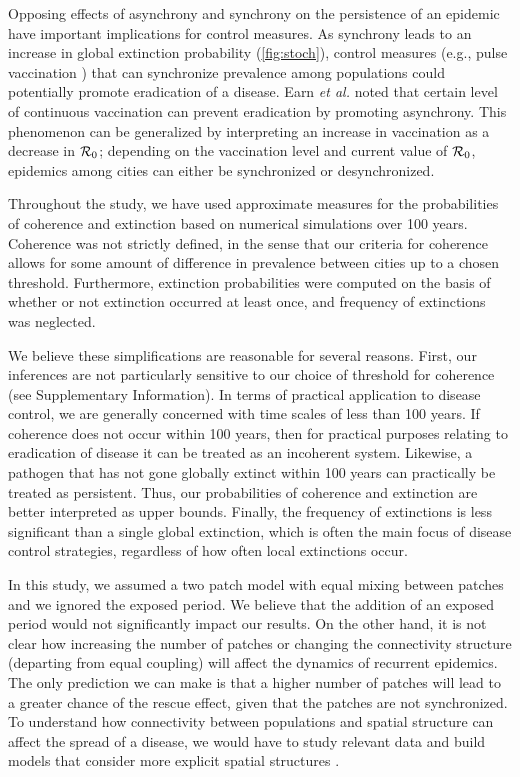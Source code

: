 \documentclass[12pt]{article}
\newcommand{\R}{{\cal R}}
\begin{document}
Opposing effects of asynchrony and synchrony on the persistence of an epidemic have important implications for control measures.
As synchrony leads to an increase in global extinction probability (\autoref{fig:stoch}), control measures (e.g., pulse vaccination \cite{agur1993pulse, shulgin1998pulse}) that can synchronize prevalence among populations could potentially promote eradication of a disease.
Earn \textit{et al.} \cite{earn1998persistence} noted that certain level of continuous vaccination can prevent eradication by promoting asynchrony.
This phenomenon can be generalized by interpreting an increase in vaccination as a decrease in $\R_0$; depending on the vaccination level and current value of $\R_0$, epidemics among cities can either be synchronized or desynchronized.

Throughout the study, we have used approximate measures for the probabilities of coherence and extinction based on numerical simulations over 100 years.
Coherence was not strictly defined, in the sense that our criteria for coherence allows for some amount of difference in prevalence between cities up to a chosen threshold.
Furthermore, extinction probabilities were computed on the basis of whether or not extinction occurred at least once, and frequency of extinctions was neglected.

We believe these simplifications are reasonable for several reasons. 
First, our inferences are not particularly sensitive to our choice of threshold for coherence (see Supplementary Information).
In terms of practical application to disease control, we are generally concerned with time scales of less than 100 years. 
If coherence does not occur within 100 years, then for practical purposes relating to eradication of disease it can be treated as an incoherent system.
Likewise, a pathogen that has not gone globally extinct within 100 years can practically be treated as persistent.
Thus, our probabilities of coherence and extinction are better interpreted as upper bounds.
Finally, the frequency of extinctions is less significant than a single global extinction, which is often the main focus of disease control strategies, regardless of how often local extinctions occur.

In this study, we assumed a two patch model with equal mixing between patches and we ignored the exposed period.
We believe that the addition of an exposed period would not significantly impact our results. 
On the other hand, it is not clear how increasing the number of patches or changing the connectivity structure (departing from equal coupling) will affect the dynamics of recurrent epidemics.
The only prediction we can make is that a higher number of patches will lead to a greater chance of the rescue effect, given that the patches are not synchronized.
To understand how connectivity between populations and spatial structure can affect the spread of a disease, we would have to study relevant data and build models that consider more explicit spatial structures \cite{grenfell2001travelling, xia2004measles}.
\end{document}
